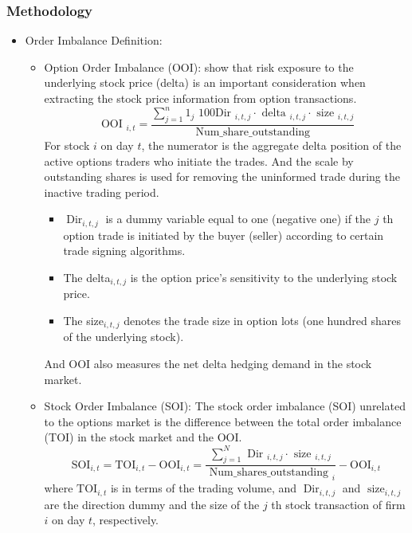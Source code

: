 \documentclass[10pt]{report}
\begin{document}
\subsubsection{Methodology}
\begin{itemize}
    \item Order Imbalance Definition:
    \begin{itemize}
        \item Option Order Imbalance (OOI): \citet{Holowczak2014AggregatingII} show that risk exposure to the underlying stock price (delta) is an important consideration when extracting the stock price information from option transactions.
        $$
        \text { OOI }_{i, t}=\frac{\sum_{j=1}^n 1_j \text { 100Dir }_{i, t, j} \cdot \text { delta }_{i, t, j} \cdot \text { size }_{i, t, j}}{\text { Num\_share\_outstanding }}
        $$
        For stock $i$ on day $t$, the numerator is the aggregate delta position of the active options traders who initiate the trades. And the scale by outstanding shares is used for removing the uninformed trade during the inactive trading period.
        \begin{itemize}
            \item $\operatorname{Dir}_{i, t, j}$ is a dummy variable equal to one (negative one) if the $j$ th option trade is initiated by the buyer (seller) according to certain trade signing algorithms. 
            \item The delta$_{i, t, j}$ is the option price's sensitivity to the underlying stock price.
            \item The size$_{i, t, j}$ denotes the trade size in option lots (one hundred shares of the underlying stock).
        \end{itemize}
        And OOI also measures the net delta hedging demand in the stock market.
        \item Stock Order Imbalance (SOI): The stock order imbalance (SOI) unrelated to the options market is the difference between the total order imbalance (TOI) in the stock market and the OOI.
        $$
\mathrm{SOI}_{i, t}=\mathrm{TOI}_{i, t}-\mathrm{OOI}_{i, t}=\frac{\sum_{j=1}^N \text { Dir }_{i, t, j} \cdot \text { size }_{i, t, j}}{\text { Num\_shares\_outstanding }_i}-\mathrm{OOI}_{i, t}
$$where $\mathrm{TOI}_{i, t}$ is in terms of the trading volume, and $\operatorname{Dir}_{i, t, j}$ and $\operatorname{size}_{i, t, j}$ are the direction dummy and the size of the $j$ th stock transaction of firm $i$ on day $t$, respectively.
    \end{itemize}

\end{itemize}
\end{document}
